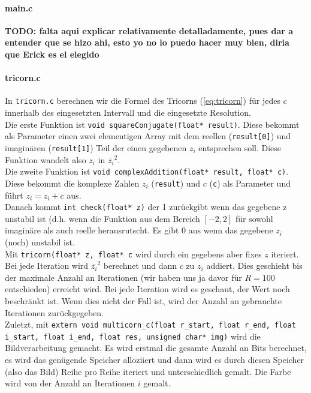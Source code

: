 \documentclass[course=erap]{aspdoc}
\begin{document}
\paragraph{main.c} 

\textbf{TODO: falta aqui explicar relativamente detalladamente, pues dar a entender que se hizo ahi, esto yo no lo puedo hacer muy bien, diria que Erick es el elegido}

\paragraph{tricorn.c}

In \lstinline{tricorn.c} berechnen wir die Formel des Tricorns (\ref{eq:tricorn}) f\"ur jedes $c$ innerhalb des eingesetzten Intervall und die eingesetzte Resolution. \\

Die erste Funktion ist \lstinline{void squareConjugate(float* result)}. Diese bekommt als Parameter einen zwei elementigen Array mit dem reellen (\lstinline{result[0]}) und imagin\"aren (\lstinline{result[1]}) Teil der einen gegebenen $z_i$ entsprechen soll. Diese Funktion wandelt also $z_i$ in $\overline{z_i}^2$. \\

Die zweite Funktion ist \lstinline{void complexAddition(float* result, float* c)}. Diese bekommt die komplexe Zahlen $z_i$ (\lstinline{result}) und $c$ (\lstinline{c}) als Parameter und f\"uhrt $z_i = z_i + c$ aus. \\

Danach kommt \lstinline{int check(float* z)} der 1 zur\"uckgibt wenn das gegebene z unstabil ist (d.h. wenn die Funktion aus dem Bereich $[-2, 2]$ f\"ur sowohl imagin\"are als auch reelle herausrutscht. Es gibt 0 aus wenn das gegebene $z_i$ (noch) unstabil ist. \\

Mit \lstinline{tricorn(float* z, float* c} wird durch ein gegebens aber fixes $z$ iteriert. Bei jede Iteration wird $\overline{z_i}^2$ berechnet und dann $c$ zu $z_i$ addiert. Dies geschieht bis der maximale Anzahl an Iterationen (wir haben uns ja davor f\"ur $R = 100$ entschieden) erreicht wird. Bei jede Iteration wird es geschaut, der Wert noch beschr\"ankt ist. Wenn dies nicht der Fall ist, wird der Anzahl an gebrauchte Iterationen zur\"uckgegeben. \\

Zuletzt, mit \lstinline{extern void multicorn_c(float r_start, float r_end, float i_start, float i_end, float res, unsigned char* img)} wird die Bildverarbeitung gemacht. Es wird erstmal die gesamte Anzahl an Bits berechnet, es wird das gen\"ugende Speicher alloziiert und dann wird es durch diesen Speicher (also das Bild) Reihe pro Reihe iteriert und unterschiedlich gemalt. Die Farbe wird von der Anzahl an Iterationen $i$ gemalt. 
\end{document}
